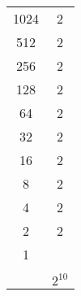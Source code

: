 \documentclass[]{article}
\begin{document}
\begin{tabular}{c|c}
	1024 & 2 \\
	512 & 2 \\
	256 & 2 \\
	128 & 2 \\ 
	64 & 2 \\
	32 & 2 \\
	16 & 2 \\
	8 & 2 \\
	4 & 2 \\
	2 & 2 \\
	1 &  \\
	\hline
	& \\
	& 	$2^{10}$
\end{tabular}
\end{document}
